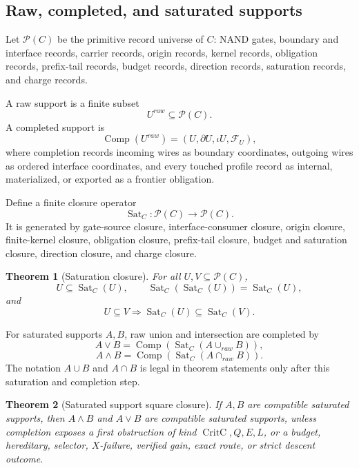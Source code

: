 \documentclass[10.5pt,a4paper]{article}
\newtheorem{theorem}{Theorem}[section]
\newcommand{\Front}{\mathcal F}
\newcommand{\Sat}{\operatorname{Sat}}
\newcommand{\Comp}{\operatorname{Comp}}
\newcommand{\CritC}{\operatorname{CritC}}
\begin{document}
\subsection{Raw, completed, and saturated supports}
Let \(\mathcal P(C)\) be the primitive record universe of \(C\): NAND gates, boundary and interface records, carrier records, origin records, kernel records, obligation records, prefix-tail records, budget records, direction records, saturation records, and charge records.

A raw support is a finite subset
\[
U^{raw}\subseteq\mathcal P(C).
\]
A completed support is
\[
\Comp(U^{raw})=(U,\partial U,\iota U,\Front_U),
\]
where completion records incoming wires as boundary coordinates, outgoing wires as ordered interface coordinates, and every touched profile record as internal, materialized, or exported as a frontier obligation.

Define a finite closure operator
\[
\Sat_C:\mathcal P(C)\to\mathcal P(C).
\]
It is generated by gate-source closure, interface-consumer closure, origin closure, finite-kernel closure, obligation closure, prefix-tail closure, budget and saturation closure, direction closure, and charge closure.

\begin{theorem}[Saturation closure]
For all \(U,V\subseteq\mathcal P(C)\),
\[
U\subseteq\Sat_C(U),\qquad \Sat_C(\Sat_C(U))=\Sat_C(U),
\]
and
\[
U\subseteq V\Longrightarrow \Sat_C(U)\subseteq\Sat_C(V).
\]
\end{theorem}

For saturated supports \(A,B\), raw union and intersection are completed by
\[
A\vee B=\Comp(\Sat_C(A\cup_{raw}B)),
\]
\[
A\wedge B=\Comp(\Sat_C(A\cap_{raw}B)).
\]
The notation \(A\cup B\) and \(A\cap B\) is legal in theorem statements only after this saturation and completion step.

\begin{theorem}[Saturated support square closure]
If \(A,B\) are compatible saturated supports, then \(A\wedge B\) and \(A\vee B\) are compatible saturated supports, unless completion exposes a first obstruction of kind \(\CritC,Q,E,L\), or a budget, hereditary, selector, \(X\)-failure, verified gain, exact route, or strict descent outcome.
\end{theorem}
\end{document}
